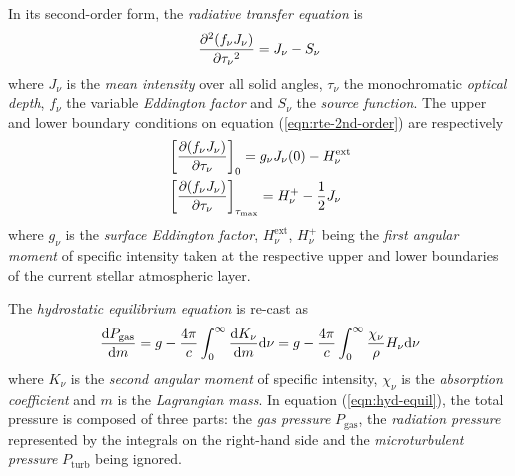     			In its second-order form, the \textit{radiative transfer equation} is
    			\begin{align}
					\dfrac{\partial^{2}{(f_\nu J_\nu)}}{\partial {\tau_\nu}^{2}}=J_\nu-S_\nu \label{eqn:rte-2nd-order}
				\end{align}
				where $J_\nu$ is the \textit{mean intensity} over all solid angles, $\tau_\nu$ the monochromatic \textit{optical depth}, $f_\nu$ the variable \textit{Eddington factor} and $S_\nu$ the \textit{source function}. The upper and lower boundary conditions on equation (\ref{eqn:rte-2nd-order}) are respectively
				\begin{align}
					&\left[ \dfrac{\partial (f_\nu J_\nu)}{\partial \tau_\nu} \right]_0=g_\nu J_\nu(0)-H_\nu^\text{ext} \label{eqn:rte-upper-bc} \\
					&\left[ \dfrac{\partial (f_\nu J_\nu)}{\partial \tau_\nu} \right]_{\tau_\text{max}}=H_\nu^+-\dfrac{1}{2}J_\nu \label{eqn:rte-lower-bc}
				\end{align}
				where $g_\nu$ is the \textit{surface Eddington factor}, $H_\nu^\text{ext}$, $H_\nu^+$ being the \textit{first angular moment} of specific intensity taken at the respective upper and lower boundaries of the current stellar atmospheric layer.
				
				The \textit{hydrostatic equilibrium equation} is re-cast as
				\begin{align}
					\dfrac{\mathrm{d}P_\text{gas}}{\mathrm{d}m}=g-\dfrac{4\pi}{c}\int_{0}^{\infty}{\dfrac{\mathrm{d}K_\nu}{\mathrm{d}m}\mathrm{d}\nu}=g-\dfrac{4\pi}{c}\int_{0}^{\infty}{\dfrac{\chi_\nu}{\rho}H_\nu\mathrm{d}\nu} \label{eqn:hyd-equil}
				\end{align}
				where $K_\nu$ is the \textit{second angular moment} of specific intensity, $\chi_\nu$ is the \textit{absorption coefficient} and $m$ is the \textit{Lagrangian mass}. In equation (\ref{eqn:hyd-equil}), the total pressure is composed of three parts: the \textit{gas pressure} $P_\text{gas}$, the \textit{radiation pressure} represented by the integrals on the right-hand side and the \textit{microturbulent pressure} $P_\text{turb}$ being ignored.
				
